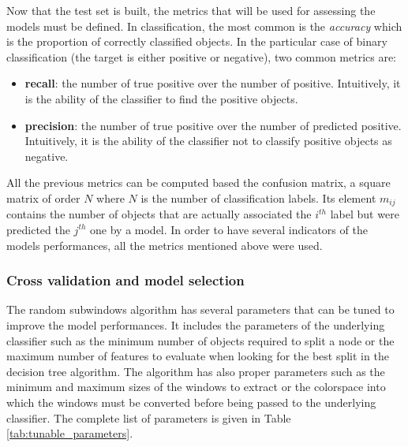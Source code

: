 Now that the test set is built, the metrics that will be used for assessing the models must be defined. In classification, the most common is the \textit{accuracy} which is the proportion of correctly classified objects. In the particular case of binary classification (the target is either positive or negative), two common metrics are:

\begin{itemize}
	\item \textbf{recall}: the number of true positive over the number of positive. Intuitively, it is the ability of the classifier to find the positive objects. 
	\item \textbf{precision}: the number of true positive over the number of predicted positive. Intuitively, it is the ability of the classifier not to classify positive objects as negative.
\end{itemize}

All the previous metrics can be computed based the confusion matrix, a square matrix of order $N$ where $N$ is the number of classification labels. Its element $m_{ij}$ contains the number of objects that are actually associated the $i^{th}$ label but were predicted the $j^{th}$ one by a model. In order to have several indicators of the models performances, all the metrics mentioned above were used. 

\subsubsection{Cross validation and model selection}
\label{sssec:thyroid_cv}
The random subwindows algorithm has several parameters that can be tuned to improve the model performances. It includes the parameters of the underlying classifier such as the minimum number of objects required to split a node or the maximum number of features to evaluate when looking for the best split in the decision tree algorithm. The algorithm has also proper parameters such as the minimum and maximum sizes of the windows to extract or the colorspace into which the windows must be converted before being passed to the underlying classifier. The complete list of parameters is given in Table \ref{tab:tunable_parameters}. 


